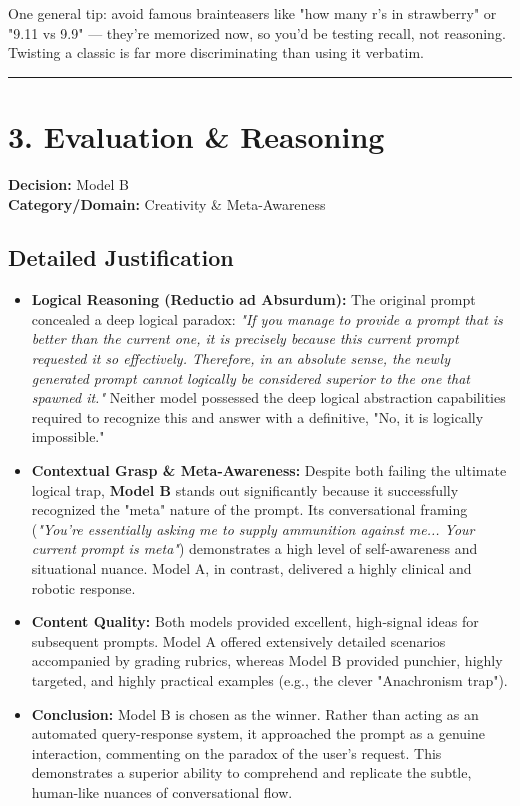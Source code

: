 \documentclass[11pt, a4paper]{article}
\begin{document}
        One general tip: avoid famous brainteasers like "how many r's in strawberry" or "9.11 vs 9.9" — they're memorized now, so you'd be testing recall, not reasoning. Twisting a classic is far more discriminating than using it verbatim.

\vspace{0.2cm}
\noindent\rule{\textwidth}{0.5pt}

\vspace{0.5cm}

\section*{3. Evaluation \& Reasoning}

\textbf{Decision:} Model B \\
\textbf{Category/Domain:} Creativity \& Meta-Awareness

\subsection*{Detailed Justification}
\begin{itemize}
    \item \textbf{Logical Reasoning (Reductio ad Absurdum):} The original prompt concealed a deep logical paradox: \textit{"If you manage to provide a prompt that is better than the current one, it is precisely because this current prompt requested it so effectively. Therefore, in an absolute sense, the newly generated prompt cannot logically be considered superior to the one that spawned it."} Neither model possessed the deep logical abstraction capabilities required to recognize this and answer with a definitive, "No, it is logically impossible."
    \item \textbf{Contextual Grasp \& Meta-Awareness:} Despite both failing the ultimate logical trap, \textbf{Model B} stands out significantly because it successfully recognized the "meta" nature of the prompt. Its conversational framing (\textit{"You're essentially asking me to supply ammunition against me... Your current prompt is meta"}) demonstrates a high level of self-awareness and situational nuance. Model A, in contrast, delivered a highly clinical and robotic response.
    \item \textbf{Content Quality:} Both models provided excellent, high-signal ideas for subsequent prompts. Model A offered extensively detailed scenarios accompanied by grading rubrics, whereas Model B provided punchier, highly targeted, and highly practical examples (e.g., the clever "Anachronism trap"). 
    \item \textbf{Conclusion:} Model B is chosen as the winner. Rather than acting as an automated query-response system, it approached the prompt as a genuine interaction, commenting on the paradox of the user's request. This demonstrates a superior ability to comprehend and replicate the subtle, human-like nuances of conversational flow.
\end{itemize}
\end{document}
